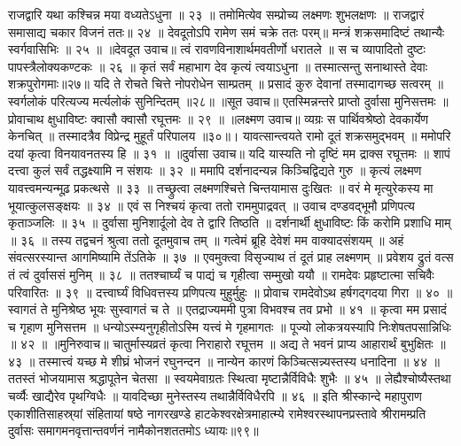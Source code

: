 राजद्वारि यथा कश्चिन्न मया वध्यतेऽधुना ॥ २३ ॥
तमोमित्येव सम्प्रोच्य लक्ष्मणः शुभलक्षणः ॥
राजद्वारं समासाद्य चकार विजनं ततः॥ २४ ॥
देवदूतोऽपि रामेण समं चक्रे ततः परम्॥
मन्त्रं शक्रसमादिष्टं तथान्यैः स्वर्गवासिभिः ॥ २५ ॥
॥देवदूत उवाच॥
त्वं रावणविनाशार्थमवतीर्णो धरातले ॥
स च व्यापादितो दुष्टः पापस्त्रैलोक्यकण्टकः ॥ २६ ॥
कृतं सर्वं महाभाग देव कृत्यं त्वयाऽधुना ॥
तस्मात्सन्तु सनाथास्ते देवाः शक्रपुरोगमाः॥२७॥
यदि ते रोचते चित्ते नोपरोधेन साम्प्रतम् ॥
प्रसादं कुरु देवानां तस्मादागच्छ सत्वरम् ॥
स्वर्गलोकं परित्यज्य मर्त्यलोकं सुनिन्दितम् ॥२८॥
॥सूत उवाच॥
एतस्मिन्नन्तरे प्राप्तो दुर्वासा मुनिसत्तमः ॥
प्रोवाचाथ क्षुधाविष्टः क्वासौ क्वासौ रघूत्तमः ॥ २९ ॥
॥लक्ष्मण उवाच॥
व्यग्रः स पार्थिवश्रेष्ठो देवकार्येण केनचित् ॥
तस्मादत्रैव विप्रेन्द्र मुहूर्तं परिपालय ॥३०॥।
यावत्सान्त्वयते रामो दूतं शक्रसमुद्भवम् ॥
ममोपरि दयां कृत्वा विनयावनतस्य हि ॥ ३१ ॥
॥दुर्वासा उवाच॥
यदि यास्यति नो दृष्टिं मम द्राक्स रघूत्तमः ॥
शापं दत्त्वा कुलं सर्वं तद्धक्ष्यामि न संशयः ॥ ३२ ॥
ममापि दर्शनादन्यन्न किञ्चिद्विद्यते गुरु ॥
कृत्यं लक्ष्मण यावत्त्वमन्यन्मूढ़ प्रकत्थसे ॥ ३३ ॥
तच्छ्रुत्वा लक्ष्मणश्चित्ते चिन्तयामास दुःखितः ॥
वरं मे मृत्युरेकस्य मा भूयात्कुलसङ्क्षयः ॥ ३४ ॥
एवं स निश्चयं कृत्वा ततो राममुपाद्रवत् ॥
उवाच दण्डवद्भूमौ प्रणिपत्य कृताञ्जलिः ॥ ३५ ॥
दुर्वासा मुनिशार्दूलो देव ते द्वारि तिष्ठति ॥
दर्शनार्थी क्षुधाविष्टः किं करोमि प्रशाधि माम् ॥ ३६ ॥
तस्य तद्वचनं श्रुत्वा ततो दूतमुवाच तम् ॥
गत्वेमं ब्रूहि देवेशं मम वाक्यादसंशयम् ॥
अहं संवत्सरस्यान्त आगमिष्यामि तेंऽतिके ॥ ३७ ॥
एवमुक्त्वा विसृज्याथ तं दूतं प्राह लक्ष्मणम् ॥
प्रवेशय द्रुतं वत्स तं त्वं दुर्वाससं मुनिम् ॥ ३८ ॥
ततश्चार्घ्यं च पाद्यं च गृहीत्वा सम्मुखो ययौ ॥
रामदेवः प्रहृष्टात्मा सचिवैः परिवारितः ॥ ३९ ॥
दत्त्वार्घ्यं विधिवत्तस्य प्रणिपत्य मुहुर्मुहुः ॥
प्रोवाच रामदेवोऽथ हर्षगद्गदया गिरा ॥ ४० ॥
स्वागतं ते मुनिश्रेष्ठ भूयः सुस्वागतं च ते ॥
एतद्राज्यममी पुत्रा विभवश्च तव प्रभो ॥ ४१ ॥
कृत्वा मम प्रसादं च गृहाण मुनिसत्तम ॥
धन्योऽस्म्यनुगृहीतोऽस्मि यत्त्वं मे गृहमागतः ॥
पूज्यो लोकत्रयस्यापि निःशेषतपसान्निधिः ॥ ४२ ॥
॥मुनिरुवाच॥
चातुर्मास्यव्रतं कृत्वा निराहारो रघूत्तम ॥
अद्य ते भवनं प्राप्य आहारार्थं बुभुक्षितः ॥ ४३ ॥
तस्मात्त्वं यच्छ मे शीघ्रं भोजनं रघुनन्दन ॥
नान्येन कारणं किञ्चित्सन्न्यस्तस्य धनादिना ॥ ४४ ॥
ततस्तं भोजयामास श्रद्धापूतेन चेतसा ॥
स्वयमेवाग्रतः स्थित्वा मृष्टान्नैर्विविधैः शुभैः ॥ ४५ ॥
लेह्यैश्चोष्यैस्तथा चर्व्यैः खाद्यैरेव पृथग्विधैः ॥
यावदिच्छा मुनेस्तस्य तथान्नैर्विविधैरपि ॥ ४६ ॥
इति श्रीस्कान्दे महापुराण एकाशीतिसाहस्र्यां संहितायां षष्ठे नागरखण्डे हाटकेश्वरक्षेत्रमाहात्म्ये रामेश्वरस्थापनप्रस्तावे श्रीरामम्प्रति दुर्वासः समागमनवृत्तान्तवर्णनं नामैकोनशततमोऽ ध्यायः॥९९॥


